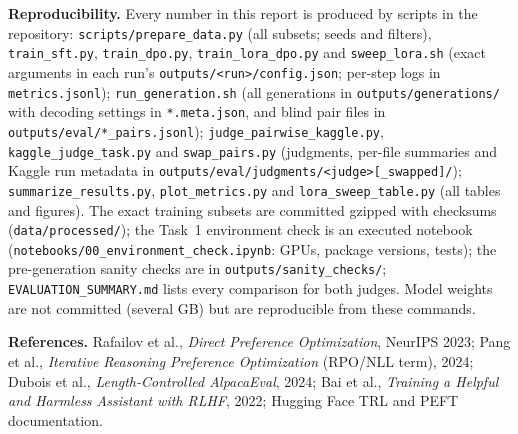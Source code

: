 \documentclass[10pt]{article}
\begin{document}
\textbf{Reproducibility.} Every number in this report is produced by scripts in the repository: \texttt{scripts/prepare\_data.py} (all subsets; seeds and filters), \texttt{train\_sft.py}, \texttt{train\_dpo.py}, \texttt{train\_lora\_dpo.py} and \texttt{sweep\_lora.sh} (exact arguments in each run's \texttt{outputs/<run>/config.json}; per-step logs in \texttt{metrics.jsonl}); \texttt{run\_generation.sh} (all generations in \texttt{outputs/generations/} with decoding settings in \texttt{*.meta.json}, and blind pair files in \texttt{outputs/eval/*\_pairs.jsonl}); \texttt{judge\_pairwise\_kaggle.py}, \texttt{kaggle\_judge\_task.py} and \texttt{swap\_pairs.py} (judgments, per-file summaries and Kaggle run metadata in \texttt{outputs/eval/judgments/<judge>[\_swapped]/}); \texttt{summarize\_results.py}, \texttt{plot\_metrics.py} and \texttt{lora\_sweep\_table.py} (all tables and figures). The exact training subsets are committed gzipped with checksums (\texttt{data/processed/}); the Task~1 environment check is an executed notebook (\texttt{notebooks/00\_environment\_check.ipynb}: GPUs, package versions, tests); the pre-generation sanity checks are in \texttt{outputs/sanity\_checks/}; \texttt{EVALUATION\_SUMMARY.md} lists every comparison for both judges. Model weights are not committed (several GB) but are reproducible from these commands.

\small
\textbf{References.} Rafailov et al., \emph{Direct Preference Optimization}, NeurIPS 2023; Pang et al., \emph{Iterative Reasoning Preference Optimization} (RPO/NLL term), 2024; Dubois et al., \emph{Length-Controlled AlpacaEval}, 2024; Bai et al., \emph{Training a Helpful and Harmless Assistant with RLHF}, 2022; Hugging Face TRL and PEFT documentation.
\end{document}
